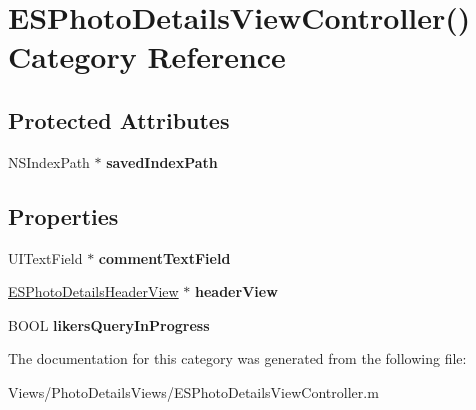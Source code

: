 \hypertarget{category_e_s_photo_details_view_controller_07_08}{}\section{E\+S\+Photo\+Details\+View\+Controller() Category Reference}
\label{category_e_s_photo_details_view_controller_07_08}
\subsection*{Protected Attributes}
\begin{DoxyCompactItemize}
\item 
\hypertarget{category_e_s_photo_details_view_controller_07_08_a750f04cf02decacb45c69861f8aec046}{}N\+S\+Index\+Path $\ast$ {\bfseries saved\+Index\+Path}\label{category_e_s_photo_details_view_controller_07_08_a750f04cf02decacb45c69861f8aec046}

\end{DoxyCompactItemize}
\subsection*{Properties}
\begin{DoxyCompactItemize}
\item 
\hypertarget{category_e_s_photo_details_view_controller_07_08_ad3004ffb3f5f3b20156e171ca622d8b5}{}U\+I\+Text\+Field $\ast$ {\bfseries comment\+Text\+Field}\label{category_e_s_photo_details_view_controller_07_08_ad3004ffb3f5f3b20156e171ca622d8b5}

\item 
\hypertarget{category_e_s_photo_details_view_controller_07_08_ad1b79fc706bd0727bba98ec8a97451c0}{}\hyperlink{interface_e_s_photo_details_header_view}{E\+S\+Photo\+Details\+Header\+View} $\ast$ {\bfseries header\+View}\label{category_e_s_photo_details_view_controller_07_08_ad1b79fc706bd0727bba98ec8a97451c0}

\item 
\hypertarget{category_e_s_photo_details_view_controller_07_08_a6d2fe0ed4405bfac39664900df4b94dc}{}B\+O\+O\+L {\bfseries likers\+Query\+In\+Progress}\label{category_e_s_photo_details_view_controller_07_08_a6d2fe0ed4405bfac39664900df4b94dc}

\end{DoxyCompactItemize}


The documentation for this category was generated from the following file\+:\begin{DoxyCompactItemize}
\item 
Views/\+Photo\+Details\+Views/E\+S\+Photo\+Details\+View\+Controller.\+m\end{DoxyCompactItemize}
